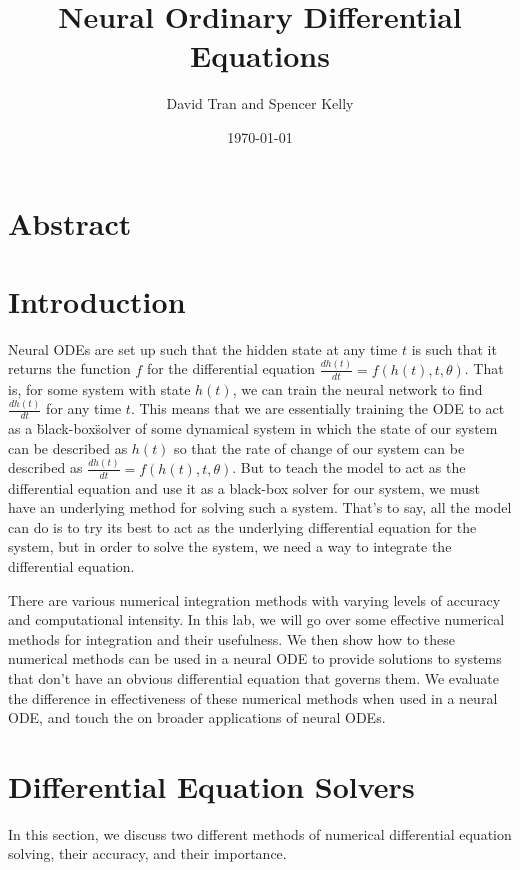 \documentclass[11pt]{article}
\title{Neural Ordinary Differential Equations}
\author{David Tran and Spencer Kelly}
\date{\today}
\begin{document}
\maketitle

\section*{Abstract}

\section{Introduction}
  Neural ODEs are set up such that the hidden state at any time $t$ is such that it returns the function $f$ for the differential equation $\frac{dh(t)}{dt} = f(h(t),t,\theta)$.
  That is, for some system with state $h(t)$, we can train the neural network to find $\frac{dh(t)}{dt}$ for any time $t$.
    This means that we are essentially training the ODE to act as a \"black-box\" solver of some dynamical system in which the state of our system can be described as $h(t)$ so that the rate of change of our system can be described as $\frac{dh(t)}{dt} = f(h(t),t,\theta)$.
    But to teach the model to act as the differential equation and use it as a black-box solver for our system, we must have an underlying method for solving such a system.
    That's to say, all the model can do is to try its best to act as the underlying differential equation for the system, but in order to solve the system, we need a way to integrate the differential equation.

  There are various numerical integration methods with varying levels of accuracy and computational intensity.
  In this lab, we will go over some effective numerical methods for integration and their usefulness.
  We then show how to these numerical methods can be used in a neural ODE to provide solutions to systems that don't have an obvious differential equation that governs them.
  We evaluate the difference in effectiveness of these numerical methods when used in a neural ODE, and touch the on broader applications of neural ODEs.


\section{Differential Equation Solvers}

In this section, we discuss two different methods of numerical differential equation solving, their accuracy, and their importance.
\end{document}
